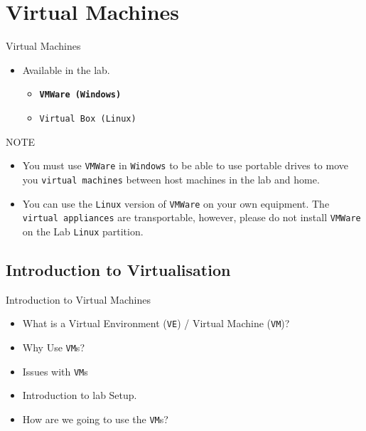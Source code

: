 \documentclass{beamer}
\begin{document}
\section{Virtual Machines}
\begin{frame}{Virtual Machines}
  \begin{itemize}
    \item Available in the lab.
      \begin{itemize}
        \item \textbf{\texttt{VMWare (Windows)}}
        \item \texttt{Virtual Box (Linux)}
      \end{itemize}
  \end{itemize}
  \begin{block}{NOTE}
    \begin{itemize}
      \item You must use \texttt{VMWare} in \texttt{Windows} to be able to use portable drives to move you \texttt{virtual machines} between host machines in the lab and home. 
      \item You can use the \texttt{Linux} version of \texttt{VMWare} on your own equipment. The \texttt{virtual appliances} are transportable, however, please do not install \texttt{VMWare} on the Lab \texttt{Linux} partition.
    \end{itemize}
  \end{block}
\end{frame}

\subsection{Introduction to Virtualisation}
\begin{frame}{Introduction to Virtual Machines}
  \begin{itemize}
    \item What is a Virtual Environment (\texttt{VE}) / Virtual Machine (\texttt{VM})?
    \item Why Use \texttt{VM}s?
    \item Issues with \texttt{VM}s
    \item Introduction to lab Setup.
    \item How are we going to use the \texttt{VM}s?
  \end{itemize}
\end{frame}
\end{document}
